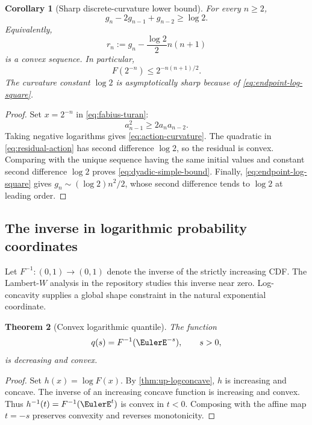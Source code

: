 \documentclass[11pt,oneside]{article}
\newtheorem{theorem}{Theorem}[section]
\newtheorem{corollary}[theorem]{Corollary}
\theoremstyle{definition}
\theoremstyle{remark}
\numberwithin{equation}{section}
\begin{document}
\begin{corollary}[Sharp discrete-curvature lower bound]
\label{cor:action-curvature}
For every $n\ge2$,
\begin{equation}
 g_n-2g_{n-1}+g_{n-2}\ge\log2.
 \label{eq:action-curvature}
\end{equation}
Equivalently,
\begin{equation}
 r_n:=g_n-\frac{\log2}{2}n(n+1)
 \label{eq:residual-action}
\end{equation}
is a convex sequence.  In particular,
\begin{equation}
 F(2^{-n})\le 2^{-n(n+1)/2}.
 \label{eq:dyadic-simple-bound}
\end{equation}
The curvature constant $\log2$ is asymptotically sharp because of
\cref{eq:endpoint-log-square}.
\end{corollary}

\begin{proof}
Set $x=2^{-n}$ in \cref{eq:fabius-turan}:
\[
 a_{n-1}^2\ge2a_na_{n-2}.
\]
Taking negative logarithms gives \cref{eq:action-curvature}.  The quadratic in
\cref{eq:residual-action} has second difference $\log2$, so the residual is
convex.  Comparing with the unique sequence having the same initial values and
constant second difference $\log2$ proves \cref{eq:dyadic-simple-bound}.
Finally, \cref{eq:endpoint-log-square} gives
$g_n\sim(\log2)n^2/2$, whose second difference tends to $\log2$ at leading
order.
\end{proof}

\subsection{The inverse in logarithmic probability coordinates}
Let $F^{-1}:(0,1)\to(0,1)$ denote the inverse of the strictly increasing CDF.
The Lambert-$W$ analysis in the repository studies this inverse near zero.
Log-concavity supplies a global shape constraint in the natural exponential
coordinate.

\begin{theorem}[Convex logarithmic quantile]
\label{thm:log-quantile-convex}
The function
\begin{equation}
 q(s)=F^{-1}(\EulerE^{-s}),\qquad s>0,
 \label{eq:log-quantile}
\end{equation}
is decreasing and convex.
\end{theorem}

\begin{proof}
Set $h(x)=\log F(x)$.  By \cref{thm:up-logconcave}, $h$ is increasing and
concave.  The inverse of an increasing concave function is increasing and
convex.  Thus $h^{-1}(t)=F^{-1}(\EulerE^t)$ is convex in $t<0$.  Composing with the
affine map $t=-s$ preserves convexity and reverses monotonicity.
\end{proof}
\end{document}
